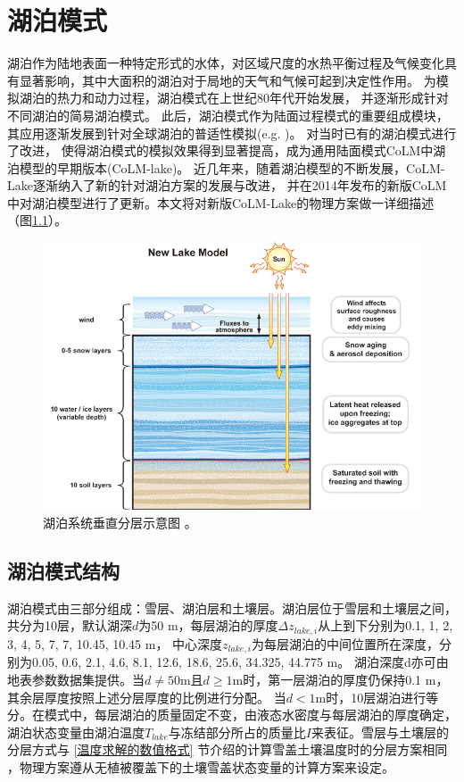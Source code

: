 \chapter{湖泊模式}
湖泊作为陆地表面一种特定形式的水体，对区域尺度的水热平衡过程及气候变化具有显著影响，其中大面积的湖泊对于局地的天气和气候可起到决定性作用。
为模拟湖泊的热力和动力过程，湖泊模式在上世纪80年代开始发展\citep{henderson1985new}，
并逐渐形成针对不同湖泊的简易湖泊模式\citep{hostetler1993interactive,hostetler1994lake,hostetler1990simulation}。
此后，湖泊模式作为陆面过程模式的重要组成模块，其应用逐渐发展到针对全球湖泊的普适性模拟(e.g. \citet{bonan1995sensitivity,bonan1996land})。
\citet{zeng2002coupling}对当时已有的湖泊模式进行了改进，
使得湖泊模式的模拟效果得到显著提高，成为通用陆面模式CoLM中湖泊模型的早期版本(CoLM-lake)。
近几年来，随着湖泊模型的不断发展，CoLM-Lake逐渐纳入了新的针对湖泊方案的发展与改进，
并在2014年发布的新版CoLM中对湖泊模型进行了更新。本文将对新版CoLM-Lake的物理方案做一详细描述（图\ref{fig:湖泊系统垂直分层示意图}）。
{
\begin{figure}[]
\centering
\includegraphics{Figures/湖泊模式/湖泊系统垂直分层示意图.png}
\caption{湖泊系统垂直分层示意图 \citep{subin2012improved}。}
\label{fig:湖泊系统垂直分层示意图}
\end{figure}
}

\section{湖泊模式结构}
湖泊模式由三部分组成：雪层、湖泊层和土壤层。湖泊层位于雪层和土壤层之间，
共分为10层，默认湖深$d$为50 m，每层湖泊的厚度$\Delta z_{lake,i}$从上到下分别为0.1, 1, 2, 3, 4, 5, 7, 7, 10.45, 10.45 m，
中心深度$z_{lake,i}$为每层湖泊的中间位置所在深度，分别为0.05, 0.6, 2.1, 4.6, 8.1, 12.6, 18.6, 25.6, 34.325, 44.775 m。
湖泊深度d亦可由地表参数数据集提供。当$d\neq50$m且$d\geq1$m时，第一层湖泊的厚度仍保持0.1 m，
其余层厚度按照上述分层厚度的比例进行分配。
当$d<1$m时，10层湖泊进行等分。在模式中，每层湖泊的质量固定不变，由液态水密度与每层湖泊的厚度确定，
湖泊状态变量由湖泊温度$T_{lake}$与冻结部分所占的质量比$I$来表征。雪层与土壤层的分层方式与 \ref{温度求解的数值格式} 节介绍的计算雪盖土壤温度时的分层方案相同
，物理方案遵从无植被覆盖下的土壤雪盖状态变量的计算方案来设定。
